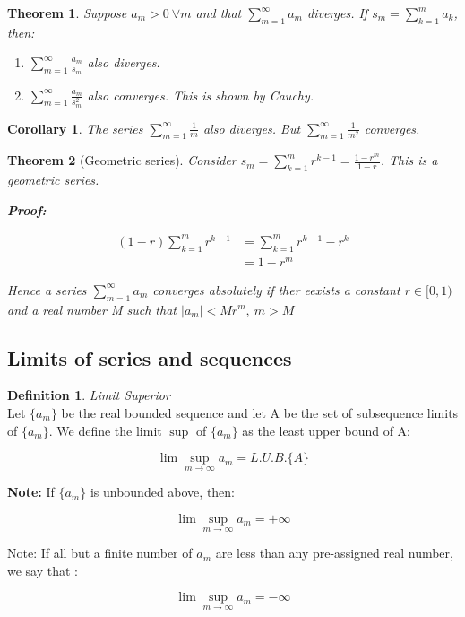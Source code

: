 \documentclass{article}
\newtheorem{theorem}{Theorem}[section]
\newtheorem{corollary}{Corollary}
\theoremstyle{definition}
\newtheorem{definition}{Definition}[section]
\newcommand{\Def}[2]{
\begin{shaded*}
\begin{definition}{\textit{#1}}\\#2\end{definition}
\end{shaded*}
}
\begin{document}
\begin{theorem}
Suppose $a_m>0\ \forall m$ and that $\sum_{m=1}^{\infty} a_m$ diverges. If $s_m = \sum_{k=1}^m a_k$, then:
\begin{enumerate}
	\item $\sum_{m=1}^{\infty} \frac{a_m}{s_m}$ also diverges.
	\item $\sum_{m=1}^{\infty} \frac{a_m}{s_m^2}$ also converges. This is shown by Cauchy. 
\end{enumerate}
\end{theorem}

\begin{corollary}
The series 	$\sum_{m=1}^{\infty} \frac{1}{m}$ also diverges. But $\sum_{m=1}^{\infty} \frac{1}{m^2}$ converges.
\end{corollary}

\begin{theorem}[Geometric series]
Consider $s_m = \sum_{k=1}^m r^{k-1} = \frac{1-r^m}{1-r}$. This is a geometric series.  

\textbf{Proof:}

\begin{align}
(1-r)\sum_{k=1}^m r^{k-1} &= \sum_{k=1}^m r^{k-1} - r^k \\ 	
& = 1-r^m
\end{align}

Hence a series $\sum_{m=1}^\infty a_m$ converges absolutely if ther eexists a constant $r \in [0,1)$ and a real number M such that $|a_m| < M r^m,\ m>M$
\end{theorem}

\subsection{Limits of series and sequences}
\Def{Limit Superior }{Let $\{a_m\}$ be the real bounded sequence and let A be the set of subsequence limits of $\{a_m\}$. We define the limit $\sup$ of $\{a_m\}$ as the least upper bound of A:

$$\lim\sup_{m \to \infty }a_m = L.U.B.\{A\}$$

\textbf{Note:} If $\{a_m\}$ is unbounded above, then:

$$\lim\sup_{m \to \infty }a_m = + \infty $$


Note: If all but a finite number of $a_m$ are less than any pre-assigned real number, we say that :

$$\lim\sup_{m \to \infty } a_m = - \infty $$
}
\end{document}
